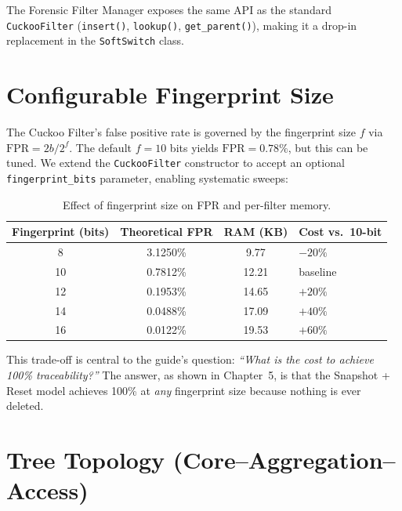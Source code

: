 \documentclass[12pt, a4paper]{report}
\begin{document}
The Forensic Filter Manager exposes the same API as the standard
\texttt{CuckooFilter} (\texttt{insert()}, \texttt{lookup()},
\texttt{get\_parent()}), making it a drop-in replacement in the
\texttt{SoftSwitch} class.

\section{Configurable Fingerprint Size}

The Cuckoo Filter's false positive rate is governed by the fingerprint
size $f$ via $\text{FPR} = 2b/2^f$. The default $f=10$ bits yields
$\text{FPR} = 0.78\%$, but this can be tuned. We extend the
\texttt{CuckooFilter} constructor to accept an optional
\texttt{fingerprint\_bits} parameter, enabling systematic sweeps:

\begin{table}[H]
\centering
\caption{Effect of fingerprint size on FPR and per-filter memory.}
\label{tab:fp-sweep-design}
\begin{tabular}{cccl}
\toprule
\textbf{Fingerprint (bits)} & \textbf{Theoretical FPR} & \textbf{RAM (KB)}
& \textbf{Cost vs.\ 10-bit} \\
\midrule
 8  & 3.1250\% &  9.77 & $-20\%$ \\
10  & 0.7812\% & 12.21 & baseline \\
12  & 0.1953\% & 14.65 & $+20\%$ \\
14  & 0.0488\% & 17.09 & $+40\%$ \\
16  & 0.0122\% & 19.53 & $+60\%$ \\
\bottomrule
\end{tabular}
\end{table}

This trade-off is central to the guide's question: \textit{``What is the
cost to achieve 100\% traceability?''} The answer, as shown in Chapter~5,
is that the Snapshot + Reset model achieves 100\% at \textit{any}
fingerprint size because nothing is ever deleted.

\section{Tree Topology (Core--Aggregation--Access)}
\label{sec:tree-topo}
\end{document}
